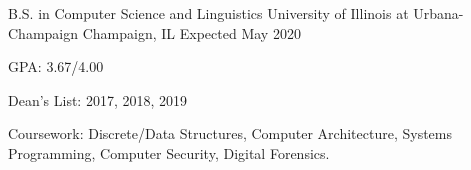

\begin{cventries}

  \cventry
    {B.S. in Computer Science and Linguistics} %
    {University of Illinois at Urbana-Champaign} %
    {Champaign, IL} %
    {Expected May 2020} %
    {
      \begin{cvitems} %
        \item {GPA: 3.67/4.00}
        \item {Dean's List: 2017, 2018, 2019}
        \item {Coursework: Discrete/Data Structures, Computer Architecture, Systems Programming, Computer Security, Digital Forensics.}%
      \end{cvitems}
    }

\end{cventries}
